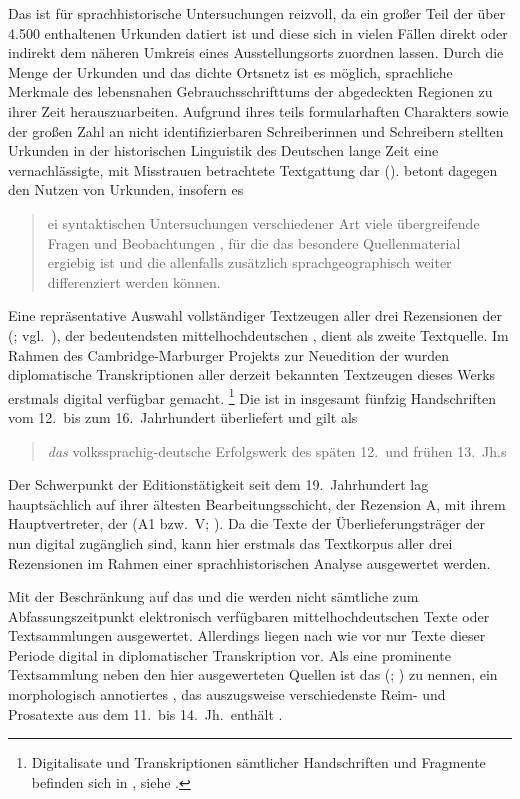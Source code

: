 Das \CAO{} ist für sprachhistorische Untersuchungen reizvoll, da ein großer
Teil der über 4.500 enthaltenen Urkunden datiert ist und diese sich in vielen
Fällen direkt oder indirekt dem näheren Umkreis eines Ausstellungsorts zuordnen
lassen. Durch die Menge der Urkunden und das dichte Ortsnetz ist es möglich,
sprachliche Merkmale des lebensnahen Gebrauchsschrifttums der abgedeckten
Regionen zu ihrer Zeit herauszuarbeiten. Aufgrund ihres teils formularhaften
Charakters sowie der großen Zahl an nicht identifizierbaren Schreiberinnen und
Schreibern stellten Urkunden in der historischen
Linguistik des Deutschen lange Zeit eine vernachlässigte,
mit Misstrauen betrachtete Textgattung dar ().
\citet[22]{schulze2011} betont dagegen den Nutzen von Urkunden, insofern es
\blockquote{ei syntaktischen Untersuchungen verschiedener Art
\textelp{} viele übergreifende Fragen und Beobachtungen , für die
das besondere Quellenmaterial ergiebig ist und die allenfalls zusätzlich
sprachgeographisch weiter differenziert werden können.}

Eine repräsentative Auswahl vollständiger Textzeugen aller drei Rezensionen der
 (\KC{}; vgl.~\cites{schroeder1895,nellmann1983}), der
bedeutendsten mittelhochdeutschen ,
dient als zweite Textquelle. Im Rahmen des Cambridge-Marburger Projekts zur
Neuedition der \KC{} \autocite[vgl.][]{chincaetal2019b}
wurden diplomatische Transkriptionen aller derzeit bekannten Textzeugen dieses
Werks erstmals digital verfügbar gemacht.%
%
	\footnote{Digitalisate und Transkriptionen sämtlicher
	Handschriften und Fragmente befinden sich in , siehe
	\nocite{kcdigital}.}
%
Die \KC{} ist in insgesamt fünfzig Handschriften vom 12.\ bis zum
16.~Jahrhundert überliefert und gilt als \blockcquote[93]{wolf2008}{\emph{das}
volkssprachig-deutsche Erfolgswerk des späten 12.\ und frühen 13.~Jh.s}. Der
Schwerpunkt der Editionstätigkeit seit dem
19.~Jahrhundert lag hauptsächlich auf ihrer ältesten Bearbeitungsschicht, der
Rezension A, mit ihrem Hauptvertreter, der  (A1
bzw.~V; \cite[vgl.][]{gaertner1999}). Da die Texte der Überlieferungsträger der
\KC{} nun digital zugänglich sind, kann hier erstmals das Textkorpus
aller drei Rezensionen im Rahmen einer sprachhistorischen Analyse ausgewertet
werden.

Mit der Beschränkung auf das \CAO{} und die \KC{} werden nicht
sämtliche zum Abfassungszeitpunkt elektronisch verfügbaren
mittelhochdeutschen Texte oder Textsammlungen
ausgewertet. Allerdings liegen nach wie vor nur Texte dieser Periode digital in
diplomatischer Transkription vor. Als eine prominente Textsammlung neben den
hier ausgewerteten Quellen ist das  (\REM; \cite{rem}) zu
nennen, ein morphologisch annotiertes , das auszugsweise
verschiedenste Reim- und Prosatexte aus dem 11.\ bis 14.~Jh.\ enthält
\autocite[siehe auch][]{wegera2000}.

